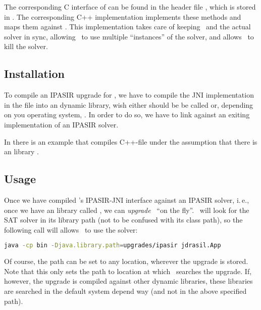 \documentclass[a4paper, ukenglish, twoside, openright]{jdrasilmanual}
\begin{document}
The corresponding C interface of  can be found
in the header file , which is
stored in . The
corresponding C++ implementation
 implements these methods and
maps them against . This implementation takes care of
keeping \Jdrasil\ and the actual solver in sync, allowing \Jdrasil\ to
use multiple ``instances'' of the solver, and allows \Jdrasil\ to kill
the solver. 

\subsection{Installation} 
To compile an IPASIR upgrade for \Jdrasil, we have to compile the JNI
implementation in the file 
into an dynamic library, wish either should be be called
 or, depending on you
operating system,
. In order to do so, we
have to link against an exiting implementation of an IPASIR solver.

In  there is an example  that compiles
C++-file under the assumption that there
is an library .


\subsection{Usage}
Once we have compiled \Jdrasil's IPASIR-JNI interface against an
IPASIR solver, i.\,e., once we have an library called
, we can \emph{upgrade}
\Jdrasil\ ``on the fly''. \Jdrasil\ will look for the SAT solver in
its library path (not to be confused with its class path), so the
following call will allows \Jdrasil\ to use the solver:
\begin{lstlisting}[language=bash]
  java -cp bin -Djava.library.path=upgrades/ipasir jdrasil.App
\end{lstlisting}
Of course, the path can be set to any location, wherever the upgrade
is stored. Note that this only sets the path to location at which
\Jdrasil\ searches the upgrade. If, however, the upgrade is compiled
against other dynamic libraries, these libraries are searched in the
default system depend way (and not in the above specified path).
\end{document}

